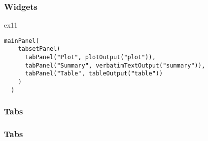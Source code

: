 \documentclass{beamer}
\begin{document}
\begin{frame}[fragile]
\frametitle{Widgets}
ex11
\begin{framed}
\begin{verbatim}
mainPanel(
    tabsetPanel(
      tabPanel("Plot", plotOutput("plot")), 
      tabPanel("Summary", verbatimTextOutput("summary")), 
      tabPanel("Table", tableOutput("table"))
    )
  )
\end{verbatim}
\end{framed}
\end{frame}
\begin{frame}
\frametitle{Tabs}

\end{frame}
\begin{frame}
\frametitle{Tabs}

\end{frame}
\end{document}
